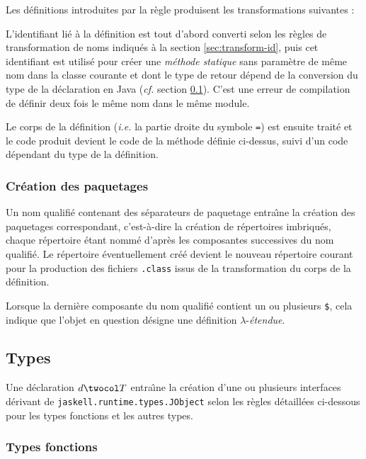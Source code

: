 Les d\'efinitions introduites par la r\`egle  produisent
les transformations suivantes :

L'identifiant li\'e \`a la d\'efinition est tout d'abord converti selon les r\`egles de
transformation de noms indiqu\'es \`a la section \ref{sec:transform-id},
puis cet identifiant est utilis\'e pour cr\'eer une \emph{m\'ethode statique }sans param\`etre
de m\^eme nom dans la classe courante et dont le type de retour d\'epend de la conversion du type de
la d\'eclaration en Java (\emph{cf.} section \ref{sec:transform-types}).
C'est une erreur de compilation de d\'efinir deux fois le m\^eme nom dans
le m\^eme module.

Le corps de la d\'efinition (\emph{i.e.} la partie droite du symbole
\texttt{=}) est ensuite trait\'e et le code produit devient le code de
la m\'ethode d\'efinie ci-dessus, suivi d'un code
 d\'ependant du type de  la d\'efinition.

\subsubsection{Cr\'eation des paquetages} 

Un nom qualifi\'e contenant des s\'eparateurs de paquetage entra\^{\i}ne la
cr\'eation des paquetages correspondant, c'est-\`a-dire la cr\'eation de
r\'epertoires imbriqu\'es, chaque r\'epertoire \'etant nomm\'e d'apr\`es les
composantes successives du nom qualifi\'e. Le r\'epertoire \'eventuellement
cr\'e\'e devient le nouveau r\'epertoire courant pour la production des
fichiers \texttt{.class} issus de la transformation du corps de la
d\'efinition. 

Lorsque la derni\`ere composante du nom qualifi\'e contient un ou
plusieurs \texttt{\$}, cela indique que l'objet en question d\'esigne
une d\'efinition $\lambda$-\emph{\'etendue}. 

\subsection{Types}
\label{sec:transform-types}

Une d\'eclaration $d \twocol T$ entra\^{\i}ne la cr\'eation d'une ou plusieurs
interfaces d\'erivant de \verb+jaskell.runtime.types.JObject+ selon les
r\`egles d\'etaill\'ees ci-dessous pour les types fonctions et les autres 
types. 

\subsubsection{Types fonctions}


